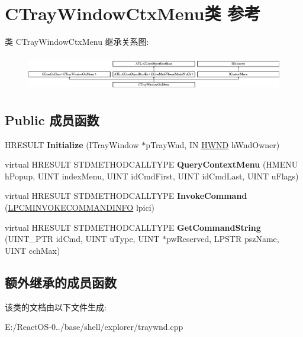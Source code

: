 \hypertarget{class_c_tray_window_ctx_menu}{}\section{C\+Tray\+Window\+Ctx\+Menu类 参考}
\label{class_c_tray_window_ctx_menu}
类 C\+Tray\+Window\+Ctx\+Menu 继承关系图\+:\begin{figure}[H]
\begin{center}
\leavevmode
\includegraphics[height=1.590909cm]{class_c_tray_window_ctx_menu}
\end{center}
\end{figure}
\subsection*{Public 成员函数}
\begin{DoxyCompactItemize}
\item 
\mbox{\label{class_c_tray_window_ctx_menu_a129a7b7ffd8fd79081c5395cfecb744e}} 
H\+R\+E\+S\+U\+LT {\bfseries Initialize} (I\+Tray\+Window $\ast$p\+Tray\+Wnd, IN \hyperlink{interfacevoid}{H\+W\+ND} h\+Wnd\+Owner)
\item 
\mbox{\label{class_c_tray_window_ctx_menu_a13b9682200e178af7879b7ff26a0c39e}} 
virtual H\+R\+E\+S\+U\+LT S\+T\+D\+M\+E\+T\+H\+O\+D\+C\+A\+L\+L\+T\+Y\+PE {\bfseries Query\+Context\+Menu} (H\+M\+E\+NU h\+Popup, U\+I\+NT index\+Menu, U\+I\+NT id\+Cmd\+First, U\+I\+NT id\+Cmd\+Last, U\+I\+NT u\+Flags)
\item 
\mbox{\label{class_c_tray_window_ctx_menu_af8b4e2008a1e93d19d09a3e300121dab}} 
virtual H\+R\+E\+S\+U\+LT S\+T\+D\+M\+E\+T\+H\+O\+D\+C\+A\+L\+L\+T\+Y\+PE {\bfseries Invoke\+Command} (\hyperlink{struct_i_context_menu_1_1tag_c_m_i_n_v_o_k_e_c_o_m_m_a_n_d_i_n_f_o}{L\+P\+C\+M\+I\+N\+V\+O\+K\+E\+C\+O\+M\+M\+A\+N\+D\+I\+N\+FO} lpici)
\item 
\mbox{\label{class_c_tray_window_ctx_menu_ab8891bfd5336d5256e0099d23abb0141}} 
virtual H\+R\+E\+S\+U\+LT S\+T\+D\+M\+E\+T\+H\+O\+D\+C\+A\+L\+L\+T\+Y\+PE {\bfseries Get\+Command\+String} (U\+I\+N\+T\+\_\+\+P\+TR id\+Cmd, U\+I\+NT u\+Type, U\+I\+NT $\ast$pw\+Reserved, L\+P\+S\+TR psz\+Name, U\+I\+NT cch\+Max)
\end{DoxyCompactItemize}
\subsection*{额外继承的成员函数}


该类的文档由以下文件生成\+:\begin{DoxyCompactItemize}
\item 
E\+:/\+React\+O\+S-\/0../base/shell/explorer/traywnd.\+cpp\end{DoxyCompactItemize}
